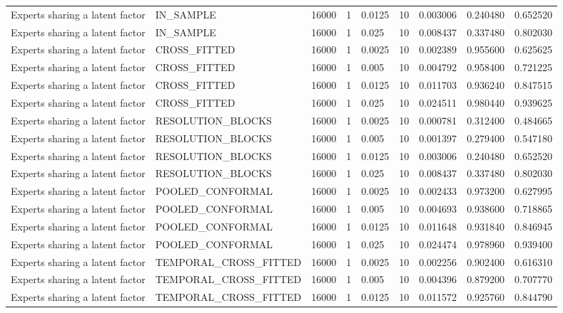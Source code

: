 \begin{tabular}{lllllllll}
Experts sharing a latent factor & IN\_SAMPLE & 16000 & 1 & 0.0125 & 10 & 0.003006 & 0.240480 & 0.652520 \\
Experts sharing a latent factor & IN\_SAMPLE & 16000 & 1 & 0.025 & 10 & 0.008437 & 0.337480 & 0.802030 \\
Experts sharing a latent factor & CROSS\_FITTED & 16000 & 1 & 0.0025 & 10 & 0.002389 & 0.955600 & 0.625625 \\
Experts sharing a latent factor & CROSS\_FITTED & 16000 & 1 & 0.005 & 10 & 0.004792 & 0.958400 & 0.721225 \\
Experts sharing a latent factor & CROSS\_FITTED & 16000 & 1 & 0.0125 & 10 & 0.011703 & 0.936240 & 0.847515 \\
Experts sharing a latent factor & CROSS\_FITTED & 16000 & 1 & 0.025 & 10 & 0.024511 & 0.980440 & 0.939625 \\
Experts sharing a latent factor & RESOLUTION\_BLOCKS & 16000 & 1 & 0.0025 & 10 & 0.000781 & 0.312400 & 0.484665 \\
Experts sharing a latent factor & RESOLUTION\_BLOCKS & 16000 & 1 & 0.005 & 10 & 0.001397 & 0.279400 & 0.547180 \\
Experts sharing a latent factor & RESOLUTION\_BLOCKS & 16000 & 1 & 0.0125 & 10 & 0.003006 & 0.240480 & 0.652520 \\
Experts sharing a latent factor & RESOLUTION\_BLOCKS & 16000 & 1 & 0.025 & 10 & 0.008437 & 0.337480 & 0.802030 \\
Experts sharing a latent factor & POOLED\_CONFORMAL & 16000 & 1 & 0.0025 & 10 & 0.002433 & 0.973200 & 0.627995 \\
Experts sharing a latent factor & POOLED\_CONFORMAL & 16000 & 1 & 0.005 & 10 & 0.004693 & 0.938600 & 0.718865 \\
Experts sharing a latent factor & POOLED\_CONFORMAL & 16000 & 1 & 0.0125 & 10 & 0.011648 & 0.931840 & 0.846945 \\
Experts sharing a latent factor & POOLED\_CONFORMAL & 16000 & 1 & 0.025 & 10 & 0.024474 & 0.978960 & 0.939400 \\
Experts sharing a latent factor & TEMPORAL\_CROSS\_FITTED & 16000 & 1 & 0.0025 & 10 & 0.002256 & 0.902400 & 0.616310 \\
Experts sharing a latent factor & TEMPORAL\_CROSS\_FITTED & 16000 & 1 & 0.005 & 10 & 0.004396 & 0.879200 & 0.707770 \\
Experts sharing a latent factor & TEMPORAL\_CROSS\_FITTED & 16000 & 1 & 0.0125 & 10 & 0.011572 & 0.925760 & 0.844790 \\

\end{tabular}
